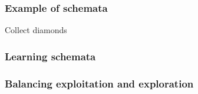 \documentclass[aspectratio=169]{beamer}
\begin{document}
\begin{frame}
\begin{center}
  \end{center}

\end{frame}

\begin{frame}
  \frametitle{Example of schemata}

  Collect diamonds
\end{frame}

\begin{frame}
  \frametitle{Learning schemata}
\end{frame}

\begin{frame}
  \frametitle{Balancing exploitation and exploration}
\end{frame}
\end{document}
